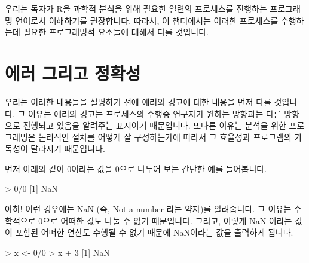 %
%
%
%
%

우리는 독자가 R을 과학적 분석을 위해 필요한 일련의 프로세스를 진행하는 프로그래밍 언어로서 이해하기를 권장합니다.
따라서, 이 챕터에서는 이러한 프로세스를 수행하는데 필요한 프로그래밍적 요소들에 대해서 다룰 것입니다. 


\section{에러 그리고 정확성}

우리는 이러한 내용들을 설명하기 전에 에러와 경고에 대한 내용을 먼저 다룰 것입니다. 
그 이유는 에러와 경고는 프로세스의 수행중 연구자가 원하는 방향과는 다른 방향으로 진행되고 있음을 알려주는 표시이기 때문입니다. 
또다른 이유는 분석을 위한 프로그래밍은 논리적인 절차를 어떻게 잘 구성하는가에 따라서 그 효율성과 프로그램의 가독성이 달라지기 때문입니다. 

먼저 아래와 같이 0이라는 값을 0으로 나누어 보는 간단한 예를 들어봅니다. 

\begin{Schunk}
\begin{Soutput}
> 0/0
[1] NaN
\end{Soutput}
\end{Schunk}

아하! 이런 경우에는 NaN (즉, Not a number 라는 약자)를 알려줍니다. 
그 이유는 수학적으로 0으로 어떠한 값도 나눌 수 없기 때문입니다. 
그리고, 이렇게 NaN 이라는 값이 포함된 어떠한 연산도 수행될 수 없기 때문에 NaN이라는 값을 출력하게 됩니다. 

\begin{Schunk}
\begin{Soutput}
> x <- 0/0
> x + 3
[1] NaN
\end{Soutput}
\end{Schunk}

